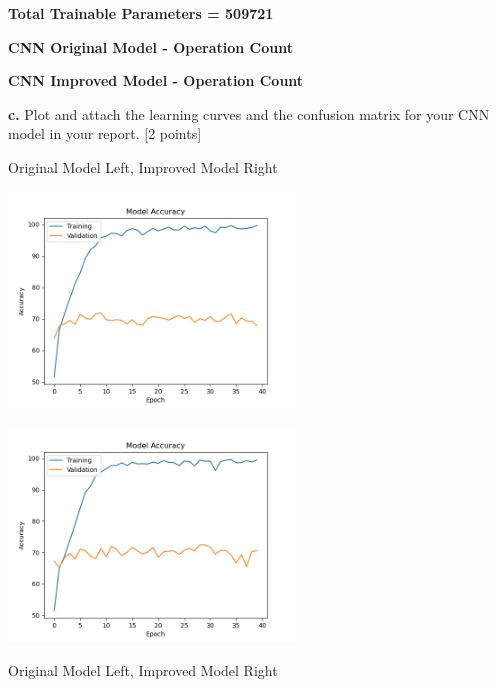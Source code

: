 \documentclass[12pt]{article}
\begin{document}
{{{{{{{{\textbf{Total Trainable Parameters = 509721}

\bigskip

\textbf{CNN Original Model - Operation Count}

\bigskip

\textbf{CNN Improved Model - Operation Count}

\bigskip

\textbf{c.} Plot and attach the learning curves and the confusion matrix for your CNN model in your report. [2 points]

\bigskip

Original Model Left, Improved Model Right

\bigskip

{\includegraphics[width = 3in]{images/CNN_accuracies}
{\includegraphics[width = 3in]{images/CNN_improved_accuracies}

\bigskip

Original Model Left, Improved Model Right

\bigskip

}}}}}}}}}}
\end{document}
